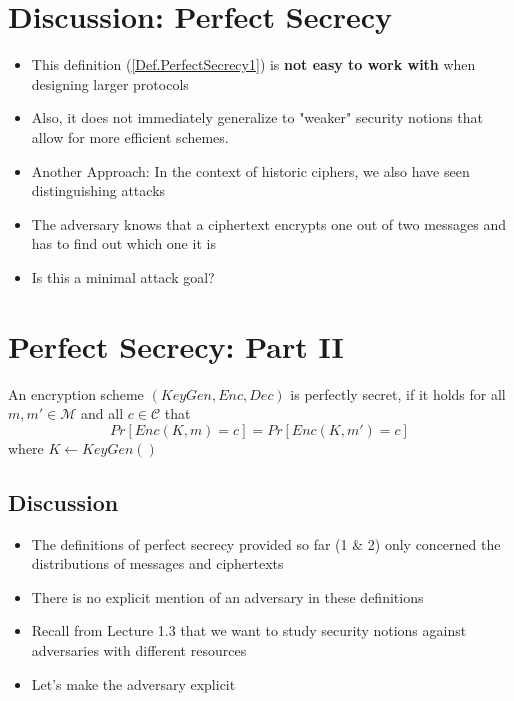 	\section{Discussion: Perfect Secrecy}
		\begin{itemize}
			\item This definition (\cref{Def.PerfectSecrecy1}) is \textbf{not easy to work with} when designing larger protocols
			\item Also, it does not immediately generalize to "weaker" security notions that allow for more efficient schemes.
			\item Another Approach: In the context of historic ciphers, we also have seen distinguishing attacks
			\item The adversary knows that a ciphertext encrypts one out of two messages and has to find out which one it is
			\item Is this a minimal attack goal?
		\end{itemize}
    
    
    
    \section{Perfect Secrecy: Part II}
    	\begin{definition}\label{Def.PerfectSecrecy2}
    		An encryption scheme $(KeyGen,Enc,Dec)$ is perfectly secret, if it holds for all $m,m' \in \mathcal{M}$ and all $c \in \mathcal{C}$ that
    		$$Pr[Enc(K,m)=c] = Pr[Enc(K,m')=c]$$
    		where $K \leftarrow KeyGen()$
    	\end{definition}
    	
    	\subsection{Discussion}
    		\begin{itemize}
    			\item The definitions of perfect secrecy provided so far (1 $\&$ 2) only concerned the distributions of messages and ciphertexts
    			\item There is no explicit mention of an adversary in these definitions
    			\item Recall from Lecture 1.3 that we want to study security notions against adversaries with different resources
    			\item Let’s make the adversary explicit
    		\end{itemize}

